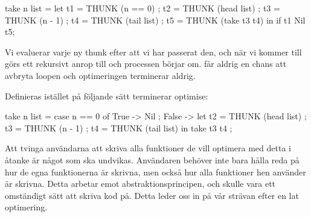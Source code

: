 \documentclass[../Optimise]{subfiles}
\begin{document}
\begin{codeEx}
take n list = let 
    { t1 = THUNK (n == 0)
    ; t2 = THUNK (head list)
    ; t3 = THUNK (n - 1)
    ; t4 = THUNK (tail list)
    ; t5 = THUNK (take t3 t4)
    } in  if t1 Nil t5;
\end{codeEx}

Vi evaluerar varje ny thunk efter att vi har passerat den, och när vi kommer till 
 görs ett rekursivt anrop till  och processen börjar om.
 får aldrig en chans att avbryta loopen och optimeringen terminerar aldrig.

Definieras  istället på följande sätt terminerar optimise:

\begin{codeEx}
take n list = case n == 0 of
    { True -> Nil
    ; False -> let 
        { t2 = THUNK (head list)
        ; t3 = THUNK (n - 1)
        ; t4 = THUNK (tail list)
        } in  take t3 t4
    };
\end{codeEx}


Att tvinga användarna att skriva alla funktioner
de vill optimera med detta i åtanke är något som ska undvikas.
 Användaren behöver inte bara hålla reda på 
hur de egna funktionerna är skrivna, men också hur alla funktioner hen använder är skrivna. 
Detta arbetar emot abstraktionsprincipen, och skulle vara ett omständigt sätt
 att skriva kod på. 
Detta leder oss in på vår strävan efter en lat optimering.
\end{document}
